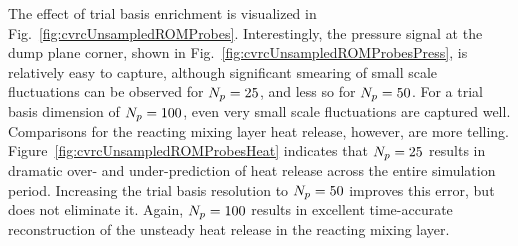 The effect of trial basis enrichment is visualized in Fig.~\ref{fig:cvrcUnsampledROMProbes}. Interestingly, the pressure signal at the dump plane corner, shown in Fig.~\ref{fig:cvrcUnsampledROMProbesPress}, is relatively easy to capture, although significant smearing of small scale fluctuations can be observed for $N_p = 25$, and less so for $N_p = 50$. For a trial basis dimension of $N_p = 100$, even very small scale fluctuations are captured well. Comparisons for the reacting mixing layer heat release, however, are more telling. Figure~\ref{fig:cvrcUnsampledROMProbesHeat} indicates that $N_p = 25$ results in dramatic over- and under-prediction of heat release across the entire simulation period. Increasing the trial basis resolution to $N_p = 50$ improves this error, but does not eliminate it. Again, $N_p = 100$ results in excellent time-accurate reconstruction of the unsteady heat release in the reacting mixing layer.

